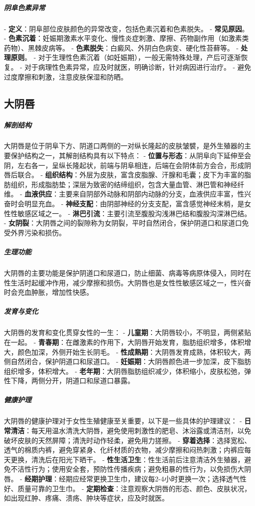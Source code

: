 \begin{enumerate}
\subparagraph{阴阜色素异常}
- \textbf{定义}：阴阜部位皮肤颜色的异常改变，包括色素沉着和色素脱失。
- \textbf{常见原因}。
  - \textbf{色素沉着}：妊娠期激素水平变化、慢性炎症刺激、摩擦、药物副作用（如激素类药物）、黑棘皮病等。
  - \textbf{色素脱失}：白癜风、外阴白色病变、硬化性苔藓等。
- \textbf{处理原则}。
  - 对于生理性色素沉着（如妊娠期），一般无需特殊处理，产后可逐渐恢复。
  - 对于病理性色素异常，应及时就医，明确诊断，针对病因进行治疗。
  - 避免过度摩擦和刺激，注意皮肤保湿和防晒。

\subsection{大阴唇}

\subparagraph{解剖结构}
大阴唇是位于阴阜下方、阴道口两侧的一对纵长隆起的皮肤皱襞，是外生殖器的主要保护结构之一，其解剖结构具有以下特点：
- \textbf{位置与形态}：从阴阜向下延伸至会阴，左右各一，呈纵长隆起状，前端与阴阜相连，后端在会阴体前方会合，形成阴唇后联合。
- \textbf{组织结构}：外层为皮肤，富含皮脂腺、汗腺和毛囊；皮下为丰富的脂肪组织，形成脂肪垫；深层为致密的结缔组织，包含大量血管、淋巴管和神经纤维。
- \textbf{血液供应}：主要来自阴部外动脉和阴部内动脉的分支，血液供应丰富，性兴奋时会明显充血。
- \textbf{神经支配}：由阴部神经的分支支配，富含感觉神经末梢，是女性性敏感区域之一。
- \textbf{淋巴引流}：主要引流至腹股沟浅淋巴结和腹股沟深淋巴结。
- \textbf{女阴裂}：大阴唇之间的裂隙称为女阴裂，平时自然闭合，保护阴道口和尿道口免受外界污染和损伤。

\subparagraph{生理功能}
大阴唇的主要功能是保护阴道口和尿道口，防止细菌、病毒等病原体侵入，同时在性生活时起缓冲作用，减少摩擦和损伤。大阴唇也是女性性敏感区域之一，性兴奋时会充血肿胀，增加性快感。

\subparagraph{发育与变化}
大阴唇的发育和变化贯穿女性的一生：
- \textbf{儿童期}：大阴唇较小，不明显，两侧紧贴在一起。
- \textbf{青春期}：在雌激素的作用下，大阴唇开始发育，脂肪组织增多，体积增大，颜色加深，外侧开始生长阴毛。
- \textbf{性成熟期}：大阴唇发育成熟，体积较大，两侧自然闭合，保护阴道口和尿道口。
- \textbf{妊娠期}：大阴唇颜色进一步加深，皮下脂肪组织增多，体积增大。
- \textbf{老年期}：大阴唇脂肪组织减少，体积缩小，皮肤松弛，弹性下降，两侧分开，阴道口和尿道口暴露。

\subparagraph{健康护理}
大阴唇的健康护理对于女性生殖健康至关重要，以下是一些具体的护理建议：
- \textbf{日常清洁}：每天用温水清洗大阴唇，避免使用刺激性的肥皂、沐浴露或清洁剂，以免破坏皮肤的天然屏障；清洗时动作轻柔，避免用力搓擦。
- \textbf{穿着选择}：选择宽松、透气的棉质内裤，避免穿紧身、化纤材质的衣物，减少摩擦和闷热刺激；内裤应每天更换，清洗后在阳光下晒干。
- \textbf{性生活卫生}：性生活前后注意清洁外生殖器，避免不洁性行为；使用安全套，预防性传播疾病；避免粗暴的性行为，以免损伤大阴唇。
- \textbf{经期护理}：经期应经常更换卫生巾，建议每2-4小时更换一次；选择透气性好、质量可靠的卫生巾。
- \textbf{定期检查}：注意观察大阴唇的形态、颜色、皮肤状况，如出现红肿、疼痛、溃疡、肿块等症状，应及时就医。


\end{enumerate}
